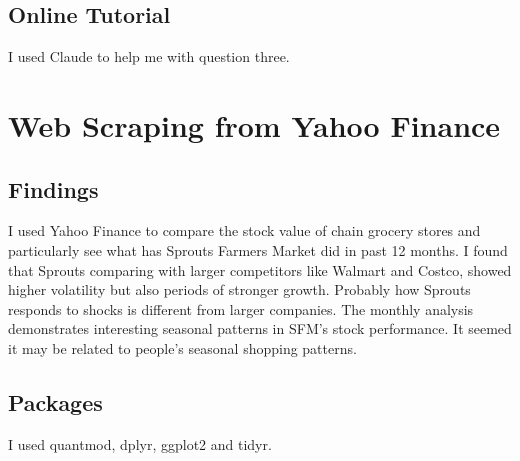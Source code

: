 \documentclass{article}
\begin{document}
\subsection{Online Tutorial}
I used Claude to help me with question three.


\section{Web Scraping from Yahoo Finance}
\subsection{Findings}
I used Yahoo Finance to compare the stock value of chain grocery stores and particularly see what has Sprouts Farmers Market did in past 12 months. 
I found that Sprouts comparing with larger competitors like Walmart and Costco, showed higher volatility but also periods of stronger growth. Probably how Sprouts responds to shocks is different from larger companies. 
The monthly analysis demonstrates interesting seasonal patterns in SFM's stock performance. It  seemed it may be related to people's seasonal shopping patterns.

\subsection{Packages}
I used quantmod, dplyr, ggplot2 and tidyr. 
\end{document}
